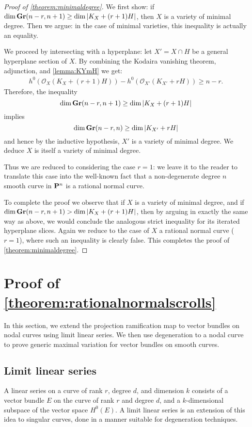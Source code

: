 \documentclass[11pt,reqno]{amsart}
\theoremstyle{plain}
\theoremstyle{definition}
\theoremstyle{remark}
\numberwithin{equation}{section}
\numberwithin{equation}{section}
\renewcommand{\O}{\mathcal O}
\begin{document}
\begin{proof}[Proof of \autoref{theorem:minimaldegree}]
  
 We first show: if $\dim \Gr(n-r, n+1) \geq \dim |K_{X} + (r+1)H|$, then $X$ is
 a variety of minimal degree.  Then we argue: in the case of minimal
 varieties, this inequality is actually an equality.

  We proceed by intersecting with a hyperplane: let $X' = X \cap H$ be a general
  hyperplane section of $X$. By combining the Kodaira vanishing theorem, adjunction, and \autoref{lemma:KYmH} we get:
  \begin{align*}
    h^{0}(\O_{X}(K_{X}+ (r+1)H)) - h^{0}(\O_{X'}(K_{X'}+ rH)) \geq n-r.
  \end{align*}
Therefore, the inequality $$\dim \Gr(n-r, n+1) \geq \dim |K_{X} + (r+1)H|$$ implies $$\dim \Gr(n-r, n) \geq \dim |K_{X'} + rH|$$ and hence by the inductive hypothesis, $X'$ is a variety of minimal degree.  We deduce $X$ is itself a variety of minimal degree. 


Thus we are reduced to considering the case $r=1$: we leave it to the reader to translate this case into the well-known fact that a non-degenerate degree $n$ smooth curve in $\P^{n}$ is a rational normal curve.

To complete the proof we observe that if $X$ is a variety of minimal degree, and if $\dim \Gr(n-r,n+1) > \dim
|K_{X}+ (r+1)H|$, then by arguing in exactly the same way as above, we would
conclude the analogous strict inequality for its iterated hyperplane slices.
Again we reduce to the case of $X$ a rational normal curve ($r=1$), where such an inequality is clearly false. This completes the proof of
\autoref{theorem:minimaldegree}.
\end{proof}



    \section{Proof of \autoref{theorem:rationalnormalscrolls}}%
    \label{sec:proof_of_theorem:rationalnormalscrolls}


In this section, we extend the projection ramification map to vector bundles on nodal curves using limit linear series.
We then use degeneration to a nodal curve to prove generic maximal variation for vector bundles on smooth curves.

\subsection{Limit linear series}\label{sec:lls}
A linear series on a curve of rank $r$, degree $d$, and dimension $k$ consists of a vector bundle $E$ on the curve of rank $r$ and degree $d$, and a $k$-dimensional subspace of the vector space $H^0(E)$.
A limit linear series is an extension of this idea to singular curves, done in a manner suitable for degeneration techniques.
\end{document}
